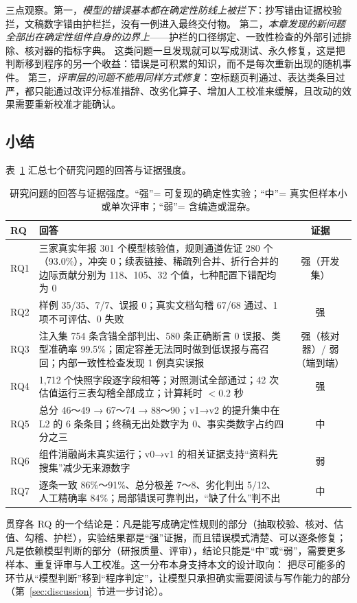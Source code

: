 三点观察。第一，\emph{模型的错误基本都在确定性防线上被拦下}：抄写错由证据校验拦，文稿数字错由护栏拦，没有一例进入最终交付物。
第二，\emph{本章发现的新问题全部出在确定性组件自身的边界上}——护栏的口径绑定、一致性检查的外部引述排除、核对器的指标字典。
这类问题一旦发现就可以写成测试、永久修复，这是把判断移到程序的另一个收益：错误是可积累的知识，而不是每次重新出现的随机事件。
第三，\emph{评审层的问题不能用同样方式修复}：空标题页判通过、表达类条目过严，都只能通过改评分标准措辞、改劣化算子、增加人工校准来缓解，且改动的效果需要重新校准才能确认。

\subsection{小结}
\label{sec:exp-summary}

表~\ref{tab:exp-summary} 汇总七个研究问题的回答与证据强度。

\begin{table}[t]
\centering
\caption{研究问题的回答与证据强度。“强”= 可复现的确定性实验；“中”= 真实但样本小或单次评审；“弱”= 含编造或混杂。}
\label{tab:exp-summary}
\small
\begin{tabularx}{\linewidth}{@{}l X c@{}}
\toprule
RQ & 回答 & 证据 \\
\midrule
RQ1 & 三家真实年报 301 个模型核验值，规则通道佐证 280 个（93.0\%），冲突 0；续表链接、稀疏列合并、折行合并的边际贡献分别为 118、105、32 个值，七种配置下错配均为 0 & 强（开发集） \\
RQ2 & 样例 35/35、7/7、误报 0；真实文档勾稽 67/68 通过、1 项不可评估、0 失败 & 强 \\
RQ3 & 注入集 754 条含错全部判出、580 条正确断言 0 误报、类型准确率 99.5\%；固定容差无法同时做到低误报与高召回；内部一致性检查发现 1 例真实误报 & 强（核对器）/ 弱（端到端） \\
RQ4 & 1,712 个快照字段逐字段相等；对照测试全部通过；42 次估值运行三表勾稽全部成立；计算耗时 $<0.2$ 秒 & 强 \\
RQ5 & 总分 46～49 → 67～74 → 88～90；v1→v2 的提升集中在 L2 的 6 条条目；终稿无出处数字为 0、事实类数字占约四分之三 & 中 \\
RQ6 & 组件消融尚未真实运行；v0→v1 的相关证据支持“资料先搜集”减少无来源数字 & 弱 \\
RQ7 & 逐条一致 86\%～91\%、总分极差 7～8、劣化判出 5/12、人工精确率 84\%；局部错误可靠判出，“缺了什么”判不出 & 中 \\
\bottomrule
\end{tabularx}
\end{table}

贯穿各 RQ 的一个结论是：凡是能写成确定性规则的部分（抽取校验、核对、估值、勾稽、护栏），实验结果都是“强”证据，而且错误模式清楚、可以逐条修复；
凡是依赖模型判断的部分（研报质量、评审），结论只能是“中”或“弱”，需要更多样本、重复评审与人工校准。这一分布本身支持本文的设计取向：
把尽可能多的环节从“模型判断”移到“程序判定”，让模型只承担确实需要阅读与写作能力的部分（第~\ref{sec:discussion}~节进一步讨论）。
